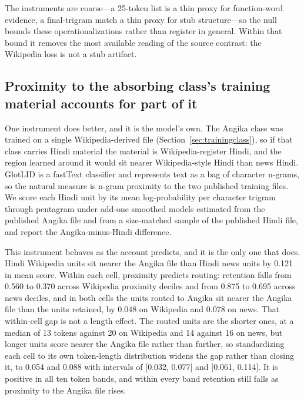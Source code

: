 \documentclass[final]{clv2025}
\newcommand{\fitexhibit}[1]{\sbox{\exhibitbox}{}\ifdim\wd\exhibitbox>\linewidth\resizebox{\linewidth}{!}{\usebox{\exhibitbox}}\else\usebox{\exhibitbox}\fi}
\newcommand{\exhibit}[1]{\fitexhibit{tables/#1.tex}}
\begin{document}
\begin{table}[tb]\centering\small\exhibit{register}
\caption{Register composition of the two Hindi L1 cells and the share of their retention gap absorbed by reweighting the news cell to the Wikipedia cell's distribution of each observable. Bracketed intervals resample source clusters within each cell.}
\label{tab:register}
\end{table}

The instruments are coarse---a 25-token list is a thin proxy for function-word evidence, a final-trigram match a thin proxy for stub structure---so the null bounds these operationalizations rather than register in general. Within that bound it removes the most available reading of the source contrast: the Wikipedia loss is not a stub artifact.

\subsection{Proximity to the absorbing class's training material accounts for part of it}\label{sec:ngram}

One instrument does better, and it is the model's own. The Angika class was trained on a single Wikipedia-derived file (Section~\ref{sec:trainingclass}), so if that class carries Hindi material the material is Wikipedia-register Hindi, and the region learned around it would sit nearer Wikipedia-style Hindi than news Hindi. GlotLID is a fastText classifier and represents text as a bag of character n-grams, so the natural measure is n-gram proximity to the two published training files. We score each Hindi unit by its mean log-probability per character trigram through pentagram under add-one smoothed models estimated from the published Angika file and from a size-matched sample of the published Hindi file, and report the Angika-minus-Hindi difference.

This instrument behaves as the account predicts, and it is the only one that does. Hindi Wikipedia units sit nearer the Angika file than Hindi news units by 0.121 in mean score. Within each cell, proximity predicts routing: retention falls from 0.560 to 0.370 across Wikipedia proximity deciles and from 0.875 to 0.695 across news deciles, and in both cells the units routed to Angika sit nearer the Angika file than the units retained, by 0.048 on Wikipedia and 0.078 on news. That within-cell gap is not a length effect. The routed units are the shorter ones, at a median of 13 tokens against 20 on Wikipedia and 14 against 16 on news, but longer units score nearer the Angika file rather than further, so standardizing each cell to its own token-length distribution widens the gap rather than closing it, to 0.054 and 0.088 with intervals of [0.032, 0.077] and [0.061, 0.114]. It is positive in all ten token bands, and within every band retention still falls as proximity to the Angika file rises.
\end{document}

